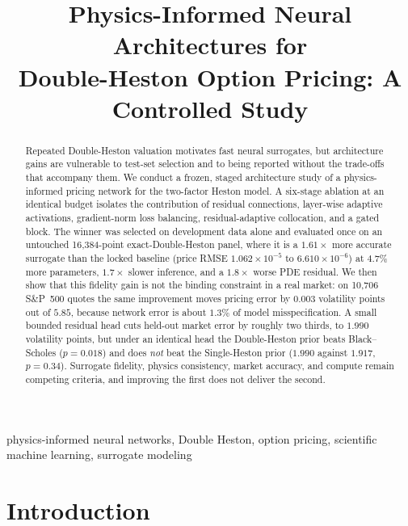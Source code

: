 \documentclass[conference]{IEEEtran}
\begin{document}
\title{Physics-Informed Neural Architectures for\\
Double-Heston Option Pricing: A Controlled Study}

\author{}

\maketitle

\begin{abstract}
Repeated Double-Heston valuation motivates fast neural surrogates, but
architecture gains are vulnerable to test-set selection and to being reported
without the trade-offs that accompany them. We conduct a frozen, staged
architecture study of a physics-informed pricing network for the two-factor
Heston model. A six-stage ablation at an identical budget isolates the
contribution of residual connections, layer-wise adaptive activations,
gradient-norm loss balancing, residual-adaptive collocation, and a gated
block. The winner was selected on development data alone and evaluated once on
an untouched 16,384-point exact-Double-Heston panel, where it is a
$1.61\times$ more accurate surrogate than the locked baseline (price RMSE
$1.062\times10^{-5}$ to $6.610\times10^{-6}$) at $4.7\%$ more parameters,
$1.7\times$ slower inference, and a $1.8\times$ worse PDE residual. We then
show that this fidelity gain is not the binding constraint in a real market:
on 10,706 S\&P~500 quotes the same improvement moves pricing error by $0.003$
volatility points out of $5.85$, because network error is about $1.3\%$ of
model misspecification. A small bounded residual head cuts held-out market
error by roughly two thirds, to $1.990$ volatility points, but under an
identical head the Double-Heston prior beats Black--Scholes ($p=0.018$) and
does \emph{not} beat the Single-Heston prior ($1.990$ against $1.917$,
$p=0.34$). Surrogate fidelity, physics consistency, market accuracy, and
compute remain competing criteria, and improving the first does not deliver
the second.
\end{abstract}

\begin{IEEEkeywords}
physics-informed neural networks, Double Heston, option pricing, scientific
machine learning, surrogate modeling
\end{IEEEkeywords}

\section{Introduction}
\end{document}
